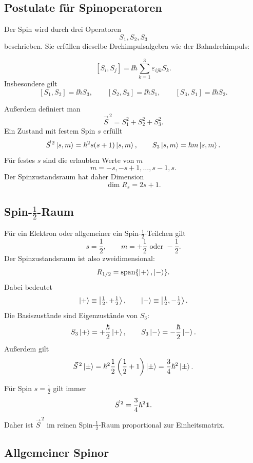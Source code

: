 \subsection{Postulate für Spinoperatoren}

Der Spin wird durch drei Operatoren
\[
    S_1,
    S_2,
    S_3
\]
beschrieben. Sie erfüllen dieselbe Drehimpulsalgebra wie der Bahndrehimpuls:

\begin{definitionbox}
\[
    [S_i,S_j] = \ii\hbar \sum_{k=1}^3 \varepsilon_{ijk} S_k.
\]
Insbesondere gilt
\[
    [S_1,S_2]=\ii\hbar S_3,
    \qquad
    [S_2,S_3]=\ii\hbar S_1,
    \qquad
    [S_3,S_1]=\ii\hbar S_2.
\]
\end{definitionbox}

Außerdem definiert man
\[
    \vec S^{\,2}=S_1^2+S_2^2+S_3^2.
\]
Ein Zustand mit festem Spin \(s\) erfüllt
\[
    \vec S^{\,2}\left|s,m\right\rangle=\hbar^2 s(s+1)\left|s,m\right\rangle,
    \qquad
    S_3\left|s,m\right\rangle=\hbar m\left|s,m\right\rangle.
\]
Für festes \(s\) sind die erlaubten Werte von \(m\)
\[
    m=-s,-s+1,\dots,s-1,s.
\]
Der Spinzustandsraum hat daher Dimension
\[
    \dim R_s = 2s+1.
\]

\subsection{Spin-\(\frac12\)-Raum}

Für ein Elektron oder allgemeiner ein Spin-\(\frac12\)-Teilchen gilt
\[
    s=\frac12,
    \qquad
    m=+\frac12 \text{ oder } -\frac12.
\]
Der Spinzustandsraum ist also zweidimensional:
\[
    R_{1/2}=\operatorname{span}\{\left|+\right\rangle,\left|-\right\rangle\}.
\]
Dabei bedeutet
\[
    \left|+\right\rangle\equiv \left|\tfrac12,+\tfrac12\right\rangle,
    \qquad
    \left|-\right\rangle\equiv \left|\tfrac12,-\tfrac12\right\rangle.
\]
Die Basiszustände sind Eigenzustände von \(S_3\):
\[
    S_3\left|+\right\rangle=+\frac{\hbar}{2}\left|+\right\rangle,
    \qquad
    S_3\left|-\right\rangle=-\frac{\hbar}{2}\left|-\right\rangle.
\]
Außerdem gilt
\[
    \vec S^{\,2}\left|\pm\right\rangle=\hbar^2\frac12\left(\frac12+1\right)\left|\pm\right\rangle
    =\frac34\hbar^2\left|\pm\right\rangle.
\]

\begin{formulabox}
Für Spin \(s=\frac12\) gilt immer
\[
    \vec S^{\,2}=\frac34\hbar^2\mathbf{1}.
\]
Daher ist \(\vec S^{\,2}\) im reinen Spin-\(\frac12\)-Raum proportional zur Einheitsmatrix.
\end{formulabox}

\subsection{Allgemeiner Spinor}

